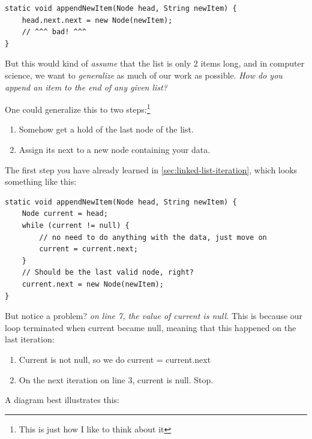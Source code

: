 \documentclass[./main.tex]{subfiles}
\begin{document}
\begin{verbatim}
static void appendNewItem(Node head, String newItem) {
    head.next.next = new Node(newItem);
    // ^^^ bad! ^^^
}
\end{verbatim}

But this would kind of \emph{assume} that the list is only 2 items long, and in computer science, we 
want to \emph{generalize} as much of our work as possible. \emph{How do you append an item to the end of any
given list?}

One could generalize this to two steps:\footnote{This is just how I like to think about it}

\begin{enumerate}
    \item Somehow get a hold of the last node of the list.
    \item Assign its next to a new node containing your data.
\end{enumerate}

The first step you have already learned in \ref{sec:linked-list-iteration}, which looks something like this:

\begin{verbatim}
static void appendNewItem(Node head, String newItem) {
    Node current = head;
    while (current != null) {
        // no need to do anything with the data, just move on
        current = current.next;
    }
    // Should be the last valid node, right?
    current.next = new Node(newItem); 
}
\end{verbatim}

But notice a problem? \emph{on line 7, the value of current is null.} This is because our loop terminated when
current became null, meaning that this happened on the last iteration:

\begin{enumerate}
    \item Current is not null, so we do {\mono current = current.next}
    \item On the next iteration on line 3, {\mono current} is null. Stop.
\end{enumerate}

A diagram best illustrates this:
\end{document}
